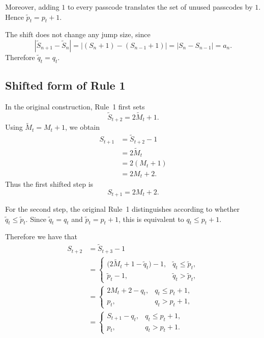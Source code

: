 \noindent
Moreover, adding \(1\) to every passcode translates the set of unused
passcodes by \(1\). Hence $\widetilde p_t=p_t+1.$

\noindent
The shift does not change any jump size, since
\[
|\widetilde S_{n+1}-\widetilde S_n|
=
|(S_n+1)-(S_{n-1}+1)|
=
|S_n-S_{n-1}|
=
a_n.
\]
Therefore $\widetilde q_t=q_t.$

\vspace{-4mm}
\subsection*{Shifted form of Rule 1}

\vspace{-3mm}

In the original construction, Rule~1 first sets
\begin{equation}
    \widetilde S_{t+2}
    =
    2\widetilde M_t+1.
\end{equation}
Using \(\widetilde M_t=M_t+1\), we obtain
\begin{align}
S_{t+1}
&=
\widetilde S_{t+2}-1
\\
&=
2\widetilde M_t
\\
&=
2(M_t+1)
\\
&=
2M_t+2.
\end{align}
Thus the first shifted step is
\begin{equation}
\boxed{
S_{t+1}=2M_t+2.
}
\end{equation}

\noindent
For the second step, the original Rule~1 distinguishes according to
whether $\widetilde q_t\leq \widetilde p_t.$
Since $\widetilde q_t=q_t$ and $\widetilde p_t=p_t+1$, this is equivalent to $q_t\leq p_t+1.$

Therefore we have that 
\begin{align}
S_{t+2}
&=
\widetilde S_{t+3}-1
\\
&=
\begin{cases}
\bigl(2\widetilde M_t+1-\widetilde q_t\bigr)-1,
& \widetilde q_t\leq \widetilde p_t,
\\[2mm]
\widetilde p_t-1,
& \widetilde q_t>\widetilde p_t,
\end{cases}
\\[2mm]
&=
\begin{cases}
2M_t+2-q_t,
& q_t\leq p_t+1,
\\[2mm]
p_t,
& q_t>p_t+1,
\end{cases}
\\[2mm]
&=
\begin{cases}
S_{t+1}-q_t,
& q_t\leq p_t+1,
\\[2mm]
p_t,
& q_t>p_t+1.
\end{cases}
\end{align}

